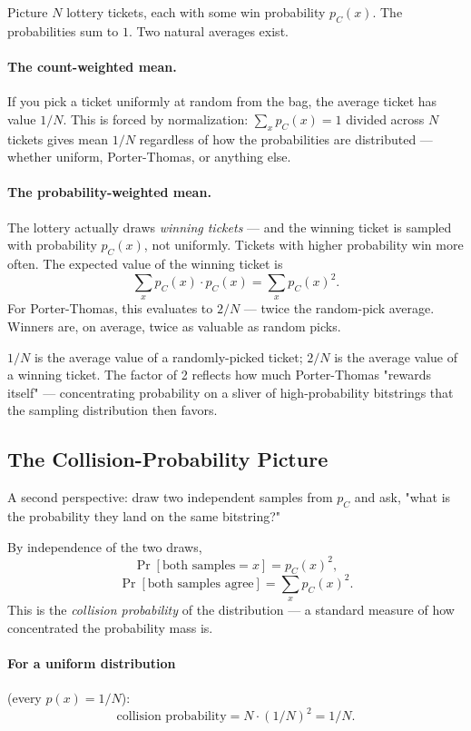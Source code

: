 \documentclass[11pt]{article}
\theoremstyle{plain}
\theoremstyle{definition}
\begin{document}
Picture $N$ lottery tickets, each with some win probability $p_C(x)$. The probabilities sum to $1$. Two natural averages exist.

\paragraph{The count-weighted mean.} If you pick a ticket uniformly at random from the bag, the average ticket has value $1/N$. This is forced by normalization: $\sum_x p_C(x) = 1$ divided across $N$ tickets gives mean $1/N$ regardless of how the probabilities are distributed --- whether uniform, Porter-Thomas, or anything else.

\paragraph{The probability-weighted mean.} The lottery actually draws \emph{winning tickets} --- and the winning ticket is sampled with probability $p_C(x)$, not uniformly. Tickets with higher probability win more often. The expected value of the winning ticket is
\[
\sum_x p_C(x) \cdot p_C(x) = \sum_x p_C(x)^2.
\]
For Porter-Thomas, this evaluates to $2/N$ --- twice the random-pick average. Winners are, on average, twice as valuable as random picks.

\begin{intuition}
$1/N$ is the average value of a randomly-picked ticket; $2/N$ is the average value of a winning ticket. The factor of 2 reflects how much Porter-Thomas "rewards itself" --- concentrating probability on a sliver of high-probability bitstrings that the sampling distribution then favors.
\end{intuition}

\subsection{The Collision-Probability Picture}

A second perspective: draw two independent samples from $p_C$ and ask, "what is the probability they land on the same bitstring?"

By independence of the two draws,
\[
\Pr[\text{both samples} = x] = p_C(x)^2,
\]
\[
\Pr[\text{both samples agree}] = \sum_x p_C(x)^2.
\]
This is the \emph{collision probability} of the distribution --- a standard measure of how concentrated the probability mass is.

\paragraph{For a uniform distribution} (every $p(x) = 1/N$):
\[
\text{collision probability} = N \cdot (1/N)^2 = 1/N.
\]
\end{document}
